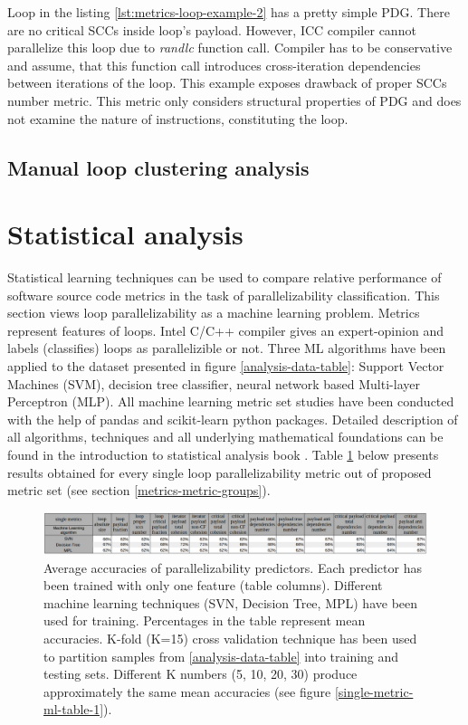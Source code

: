 \null\qquad Loop in the listing \ref{lst:metrics-loop-example-2} has a pretty simple PDG. There are no critical SCCs inside loop's payload. However, ICC compiler cannot parallelize this loop due to \textit{randlc} function call. Compiler has to be conservative and assume, that this function call introduces cross-iteration dependencies between iterations of the loop.\newline
\null\qquad This example exposes drawback of proper SCCs number metric. This metric only considers structural properties of PDG and does not examine the nature of instructions, constituting the loop. 
\subsection{Manual loop clustering analysis}


\section{Statistical analysis}
\label{analysis-statistical-analysis}
\qquad Statistical learning techniques can be used to compare relative performance of software source code metrics in the task of parallelizability classification. This section views loop parallelizability as a machine learning problem. Metrics represent features of loops. Intel C/C++ compiler gives an expert-opinion and labels (classifies) loops as parallelizible or not. Three ML algorithms have been applied to the dataset presented in figure \ref{analysis-data-table}: Support Vector Machines (SVM), decision tree classifier, neural network based Multi-layer Perceptron (MLP). All machine learning metric set studies have been conducted with the help of pandas \cite{python-lib-pandas} and scikit-learn \cite{python-lib-scikit-learn} python packages. Detailed description of all algorithms, techniques and all underlying mathematical foundations can be found in the introduction to statistical analysis book \cite{statistical-learning-book}.\newline
\null\qquad Table \ref{single-metric-ml-table-0} below presents results obtained for every single loop parallelizability metric out of proposed metric set (see section \ref{metrics-metric-groups}).
\begin{figure}[htb]
\centering
\includegraphics[width=\linewidth]{figs/single-metric-ml-table-0.png}
\caption{Average accuracies of parallelizability predictors. Each predictor has been trained with only one feature (table columns). Different machine learning techniques (SVN, Decision Tree, MPL) have been used for training. Percentages in the table represent mean accuracies. K-fold (K=15) cross validation technique has been used to partition samples from \ref{analysis-data-table} into training and testing sets. Different K numbers (5, 10, 20, 30) produce approximately the same mean accuracies (see figure \ref{single-metric-ml-table-1}).}
\label{single-metric-ml-table-0}
\end{figure}\newline 
